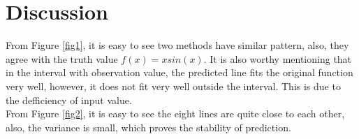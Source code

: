 \documentclass{article} %
\newcounter{other}
\begin{document}
\section{Discussion}
From Figure \ref{fig1}, it is easy to see two methods have similar pattern, also, they agree with the truth value $f(x)=xsin(x)$. It is also worthy mentioning that in the interval with observation value, the predicted line fits the original function very well, however, it does not fit very well outside the interval. This is due to the defficiency of input value.\\

From Figure \ref{fig2}, it is easy to see the eight lines are quite close to each other, also, the variance is small, which proves the stability of prediction.\\
\end{document}
